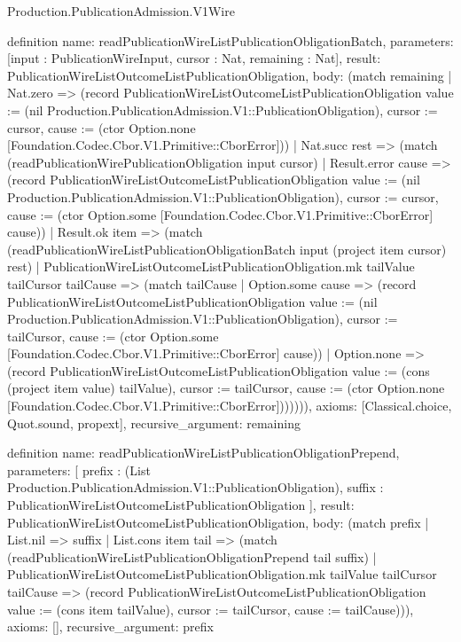 \begin{lexlean}{Production.PublicationAdmission.V1Wire}
\begin{semanticmodule}
definition{
  name: readPublicationWireListPublicationObligationBatch,
  parameters: [input : PublicationWireInput, cursor : Nat, remaining : Nat],
  result: PublicationWireListOutcomeListPublicationObligation,
  body: (match remaining
    | Nat.zero => (record PublicationWireListOutcomeListPublicationObligation {value := (nil Production.PublicationAdmission.V1::PublicationObligation), cursor := cursor, cause := (ctor Option.none [Foundation.Codec.Cbor.V1.Primitive::CborError])})
    | Nat.succ rest => (match (readPublicationWirePublicationObligation input cursor)
      | Result.error cause => (record PublicationWireListOutcomeListPublicationObligation {value := (nil Production.PublicationAdmission.V1::PublicationObligation), cursor := cursor, cause := (ctor Option.some [Foundation.Codec.Cbor.V1.Primitive::CborError] cause)})
      | Result.ok item => (match (readPublicationWireListPublicationObligationBatch input (project item cursor) rest)
        | PublicationWireListOutcomeListPublicationObligation.mk tailValue tailCursor tailCause => (match tailCause
          | Option.some cause => (record PublicationWireListOutcomeListPublicationObligation {value := (nil Production.PublicationAdmission.V1::PublicationObligation), cursor := tailCursor, cause := (ctor Option.some [Foundation.Codec.Cbor.V1.Primitive::CborError] cause)})
          | Option.none => (record PublicationWireListOutcomeListPublicationObligation {value := (cons (project item value) tailValue), cursor := tailCursor, cause := (ctor Option.none [Foundation.Codec.Cbor.V1.Primitive::CborError])}))))),
  axioms: [Classical.choice, Quot.sound, propext],
  recursive_argument: remaining
}

definition{
  name: readPublicationWireListPublicationObligationPrepend,
  parameters: [
    prefix : (List Production.PublicationAdmission.V1::PublicationObligation),
    suffix : PublicationWireListOutcomeListPublicationObligation
  ],
  result: PublicationWireListOutcomeListPublicationObligation,
  body: (match prefix
    | List.nil => suffix
    | List.cons item tail => (match (readPublicationWireListPublicationObligationPrepend tail suffix)
      | PublicationWireListOutcomeListPublicationObligation.mk tailValue tailCursor tailCause => (record PublicationWireListOutcomeListPublicationObligation {value := (cons item tailValue), cursor := tailCursor, cause := tailCause}))),
  axioms: [],
  recursive_argument: prefix
}


\end{semanticmodule}
\end{lexlean}
